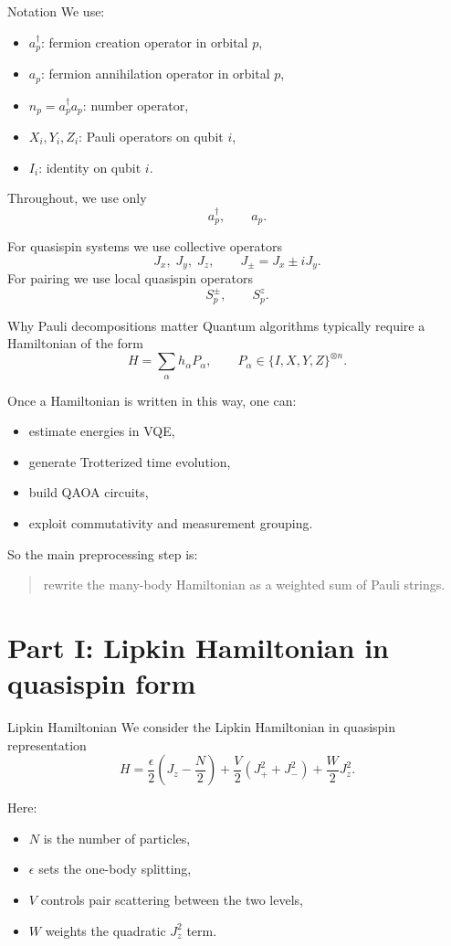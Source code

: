 \documentclass[aspectratio=169]{beamer}
\begin{document}
\begin{frame}{Notation}
We use:
\begin{itemize}
\item \(a_p^\dagger\): fermion creation operator in orbital \(p\),
\item \(a_p\): fermion annihilation operator in orbital \(p\),
\item \(n_p=a_p^\dagger a_p\): number operator,
\item \(X_i,Y_i,Z_i\): Pauli operators on qubit \(i\),
\item \(I_i\): identity on qubit \(i\).
\end{itemize}

Throughout, we use only
\[
a_p^\dagger,\qquad a_p.
\]

For quasispin systems we use collective operators
\[
J_x,\; J_y,\; J_z,\qquad J_\pm = J_x \pm i J_y.
\]
For pairing we use local quasispin operators
\[
S_p^\pm,\qquad S_p^z.
\]
\end{frame}

\begin{frame}{Why Pauli decompositions matter}
Quantum algorithms typically require a Hamiltonian of the form
\[
H = \sum_\alpha h_\alpha P_\alpha,
\qquad
P_\alpha \in \{I,X,Y,Z\}^{\otimes n}.
\]

Once a Hamiltonian is written in this way, one can:
\begin{itemize}
\item estimate energies in VQE,
\item generate Trotterized time evolution,
\item build QAOA circuits,
\item exploit commutativity and measurement grouping.
\end{itemize}

So the main preprocessing step is:
\begin{quote}
rewrite the many-body Hamiltonian as a weighted sum of Pauli strings.
\end{quote}
\end{frame}

\section{Part I: Lipkin Hamiltonian in quasispin form}

\begin{frame}{Lipkin Hamiltonian}
We consider the Lipkin Hamiltonian in quasispin representation
\[
H
=
\frac{\epsilon}{2}\left(J_z-\frac{N}{2}\right)
+
\frac{V}{2}\left(J_+^2+J_-^2\right)
+
\frac{W}{2}J_z^2.
\]

Here:
\begin{itemize}
\item \(N\) is the number of particles,
\item \(\epsilon\) sets the one-body splitting,
\item \(V\) controls pair scattering between the two levels,
\item \(W\) weights the quadratic \(J_z^2\) term.
\end{itemize}
\end{frame}
\end{document}
